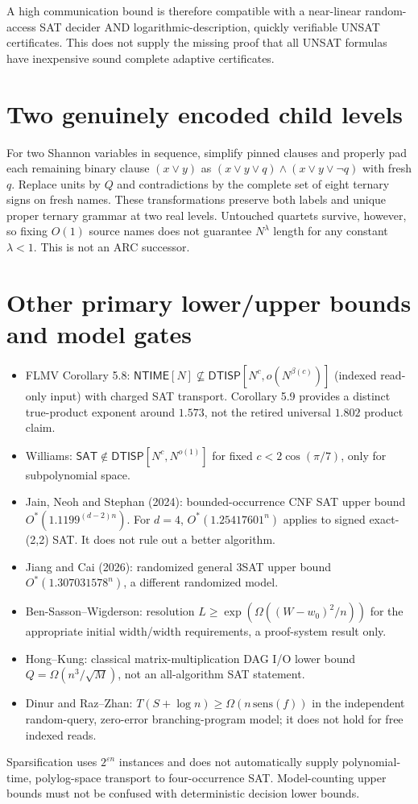 \documentclass[11pt]{article}
\newcommand{\SAT}{\mathsf{SAT}}
\newcommand{\NTIME}{\mathsf{NTIME}}
\newcommand{\DTISP}{\mathsf{DTISP}}
\begin{document}
A high communication bound is therefore compatible with a near-linear random-access SAT decider AND logarithmic-description, quickly verifiable UNSAT certificates. This does not supply the missing proof that all UNSAT formulas have inexpensive sound complete adaptive certificates.
\section{Two genuinely encoded child levels}
For two Shannon variables in sequence, simplify pinned clauses and properly pad each remaining binary clause $(x\vee y)$ as $(x\vee y\vee q)\land(x\vee y\vee\neg q)$ with fresh $q$. Replace units by $Q$ and contradictions by the complete set of eight ternary signs on fresh names. These transformations preserve both labels and unique proper ternary grammar at two real levels. Untouched quartets survive, however, so fixing $O(1)$ source names does not guarantee $N^\lambda$ length for any constant $\lambda<1$. This is not an ARC successor.
\section{Other primary lower/upper bounds and model gates}
\begin{itemize}
\item FLMV Corollary 5.8: $\NTIME[N]\not\subseteq\DTISP[N^c,o(N^{\beta(c)})]$ (indexed read-only input) with charged SAT transport. Corollary 5.9 provides a distinct true-product exponent around $1.573$, not the retired universal $1.802$ product claim.
\item Williams: $\SAT\notin\DTISP[N^c,N^{o(1)}]$ for fixed $c<2\cos(\pi/7)$, only for subpolynomial space.
\item Jain, Neoh and Stephan (2024): bounded-occurrence CNF SAT upper bound $O^*(1.1199^{(d-2)n})$. For $d=4$, $O^*(1.25417601^n)$ applies to signed exact-(2,2) SAT. It does not rule out a better algorithm.
\item Jiang and Cai (2026): randomized general 3SAT upper bound $O^*(1.307031578^n)$, a different randomized model.
\item Ben-Sasson--Wigderson: resolution $L\ge\exp(\Omega((W-w_0)^2/n))$ for the appropriate initial width/width requirements, a proof-system result only.
\item Hong--Kung: classical matrix-multiplication DAG I/O lower bound $Q=\Omega(n^3/\sqrt M)$, not an all-algorithm SAT statement.
\item Dinur and Raz--Zhan: $T(S+\log n)\ge\Omega(n\,\mathrm{sens}(f))$ in the independent random-query, zero-error branching-program model; it does not hold for free indexed reads.
\end{itemize}
Sparsification uses $2^{\varepsilon n}$ instances and does not automatically supply polynomial-time, polylog-space transport to four-occurrence SAT. Model-counting upper bounds must not be confused with deterministic decision lower bounds.
\end{document}
